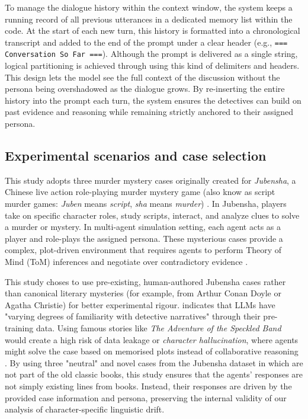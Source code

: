 \documentclass{article}
\begin{document}
To manage the dialogue history within the context window, the system keeps a running record of all previous utterances in a dedicated memory list within the code. At the start of each new turn, this history is formatted into a chronological transcript and added to the end of the prompt under a clear header (e.g., \texttt{=== Conversation So Far ===}). Although the prompt is delivered as a single string, logical partitioning is achieved through using this kind of delimiters and headers. This design lets the model see the full context of the discussion without the persona being overshadowed as the dialogue grows. By re-inserting the entire history into the prompt each turn, the system ensures the detectives can build on past evidence and reasoning while remaining strictly anchored to their assigned persona.

\subsection{Experimental scenarios and case selection} \label{sec:methods_case}

This study adopts three murder mystery cases originally created for \emph{Jubensha}, a Chinese live action role-playing murder mystery game (also know as script murder games: \textit{Juben} means \textit{script}, \textit{sha} means \textit{murder}) \citep{ghorbanpour2023jubensha}. In Jubensha, players take on specific character roles, study scripts, interact, and analyze clues to solve a murder or mystery. In multi-agent simulation setting, each agent acts as a player and role-plays the assigned persona. These mysterious cases provide a complex, plot-driven environment that requires agents to perform Theory of Mind (ToM) inferences and negotiate over contradictory evidence \citep{zhu2024player, wu2024jubensha}.

This study choses to use pre-existing, human-authored Jubensha cases rather than canonical literary mysteries (for example, from Arthur Conan Doyle or Agatha Christie) for better experimental rigour. \citet{delima2025detective} indicates that LLMs have "varying degrees of familiarity with detective narratives" through their pre-training data. Using famous stories like \textit{The Adventure of the Speckled Band} \citep{doyle1892speckled} would create a high risk of data leakage or \emph{character hallucination}, where agents might solve the case based on memorised plots instead of collaborative reasoning \citep{chen2023hp, chen2024review}. By using three "neutral" and novel cases from the Jubensha dataset in \citet{wu2024jubensha} which are not part of the old classic books, this study ensures that the agents' responses are not simply existing lines from books. Instead, their responses are driven by the provided case information and persona, preserving the internal validity of our analysis of character-specific linguistic drift.
\end{document}
